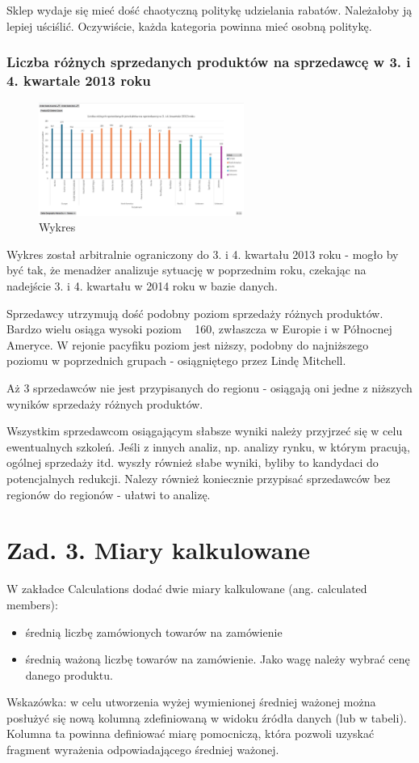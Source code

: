 \documentclass[a4paper,12pt]{article}
\begin{document}
Sklep wydaje się mieć dość chaotyczną politykę udzielania rabatów. Należałoby ją lepiej uściślić. Oczywiście, każda kategoria powinna mieć osobną politykę.

\subsubsection{Liczba różnych sprzedanych produktów na sprzedawcę w 3. i 4. kwartale 2013 roku}

\begin{figure}[H]
  \includegraphics[width=0.6\textwidth]{images/sales_salesperson.png}
  \caption{Wykres}
\end{figure}

Wykres został arbitralnie ograniczony do 3. i 4. kwartału 2013 roku - mogło by być tak, że menadżer analizuje sytuację w poprzednim roku, czekając na nadejście 3. i 4. kwartału w 2014 roku w bazie danych.

Sprzedawcy utrzymują dość podobny poziom sprzedaży różnych produktów. Bardzo wielu osiąga wysoki poziom ~ 160, zwłaszcza w Europie i w Północnej Ameryce. W rejonie pacyfiku poziom jest niższy, podobny do najniższego poziomu w poprzednich grupach - osiągniętego przez Lindę Mitchell.

Aż 3 sprzedawców nie jest przypisanych do regionu - osiągają oni jedne z niższych wyników sprzedaży różnych produktów.

Wszystkim sprzedawcom osiągającym słabsze wyniki należy przyjrzeć się w celu ewentualnych szkoleń. Jeśli z innych analiz, np. analizy rynku, w którym pracują, ogólnej sprzedaży itd. wyszły również słabe wyniki, byliby to kandydaci do potencjalnych redukcji. Nalezy również koniecznie przypisać sprzedawców bez regionów do regionów - ułatwi to analizę.

\section{Zad. 3. Miary kalkulowane}

W zakładce Calculations dodać dwie miary kalkulowane (ang. calculated members):\begin{itemize}
  \item średnią liczbę zamówionych towarów na zamówienie
  \item średnią ważoną liczbę towarów na zamówienie. Jako wagę należy wybrać cenę danego produktu.
\end{itemize}
Wskazówka: w celu utworzenia wyżej wymienionej średniej ważonej można posłużyć się nową
kolumną zdefiniowaną w widoku źródła danych (lub w tabeli). Kolumna ta powinna definiować
miarę pomocniczą, która pozwoli uzyskać fragment wyrażenia odpowiadającego średniej
ważonej.
\end{document}
